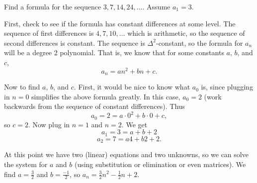 \documentclass[11pt,]{book}
\theoremstyle{ptxplainnotitle}
\theoremstyle{ptxplaintitle}
\theoremstyle{ptxdefinitionnotitle}
\theoremstyle{ptxdefinitiontitle}
\theoremstyle{ptxdefinitionnotitle}
\theoremstyle{ptxdefinitiontitle}
\theoremstyle{ptxdefinitionnotitle}
\theoremstyle{ptxdefinitiontitle}
\theoremstyle{ptxdefinitiontitlenonumber}
\theoremstyle{ptxdefinitiontitlenonumber}
\numberwithin{equation}{chapter}
\begin{document}
\begin{example}\label{example-15}
\hypertarget{p-353}{}%
Find a formula for the sequence \(3, 7, 14, 24,\ldots\). Assume \(a_1 = 3\).%
\par\smallskip%
\noindent\textbf{}\hypertarget{solution-46}{}\hypertarget{p-354}{}%
First, check to see if the formula has constant differences at some level. The sequence of first differences is \(4, 7, 10, \ldots\) which is arithmetic, so the sequence of second differences is constant. The sequence is \(\Delta^2\)-constant, so the formula for \(a_n\) will be a degree 2 polynomial. That is, we know that for some constants \(a\), \(b\), and \(c\),%
\begin{equation*}
a_n = an^2 + bn + c.
\end{equation*}
%
\par
\hypertarget{p-355}{}%
Now to find \(a\), \(b\), and \(c\). First, it would be nice to know what \(a_0\) is, since plugging in \(n = 0\) simplifies the above formula greatly. In this case, \(a_0 = 2\) (work backwards from the sequence of constant differences). Thus%
\begin{equation*}
a_0 = 2 = a\cdot 0^2 + b \cdot 0 + c,
\end{equation*}
so \(c = 2\). Now plug in \(n =1\) and \(n = 2\). We get%
\begin{equation*}
a_1 = 3 = a + b + 2
\end{equation*}
%
\begin{equation*}
a_2 = 7 = a4 + b 2 + 2.
\end{equation*}
%
\par
\hypertarget{p-356}{}%
At this point we have two (linear) equations and two unknowns, so we can solve the system for \(a\) and \(b\) (using substitution or elimination or even matrices). We find \(a = \frac{3}{2}\) and \(b = \frac{-1}{2}\), so \(a_n = \frac{3}{2} n^2 - \frac{1}{2}n + 2\).%
\end{example}
\end{document}
